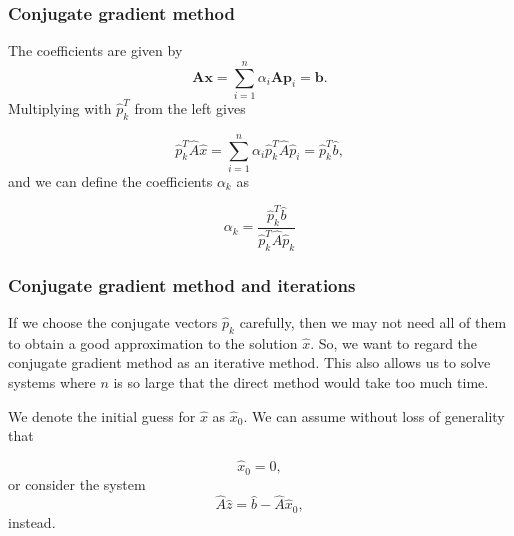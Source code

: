\documentclass{beamer}
\begin{document}
\begin{frame}
\frametitle{Conjugate gradient method}

\begin{block}{}
The coefficients are given by
\begin{equation*}
    \mathbf{A}\mathbf{x} = \sum^{n}_{i=1} \alpha_i \mathbf{A} \mathbf{p}_i = \mathbf{b}.
\end{equation*}
Multiplying with $\hat{p}_k^T$  from the left gives

\begin{equation*}
  \hat{p}_k^T \hat{A}\hat{x} = \sum^{n}_{i=1} \alpha_i\hat{p}_k^T \hat{A}\hat{p}_i= \hat{p}_k^T \hat{b},
\end{equation*}
and we can define the coefficients $\alpha_k$ as

\begin{equation*}
    \alpha_k = \frac{\hat{p}_k^T \hat{b}}{\hat{p}_k^T \hat{A} \hat{p}_k}
\end{equation*}
\end{block}
\end{frame}

\begin{frame}
\frametitle{Conjugate gradient method and iterations}

\begin{block}{}

If we choose the conjugate vectors $\hat{p}_k$ carefully, 
then we may not need all of them to obtain a good approximation to the solution 
$\hat{x}$. 
So, we want to regard the conjugate gradient method as an iterative method. 
This also allows us to solve systems where $n$ is so large that the direct 
method would take too much time.

We denote the initial guess for $\hat{x}$ as $\hat{x}_0$. 
We can assume without loss of generality that

\begin{equation*}
\hat{x}_0=0,
\end{equation*}
or consider the system
\begin{equation*}
\hat{A}\hat{z} = \hat{b}-\hat{A}\hat{x}_0,
\end{equation*}
instead.
\end{block}
\end{frame}
\end{document}
